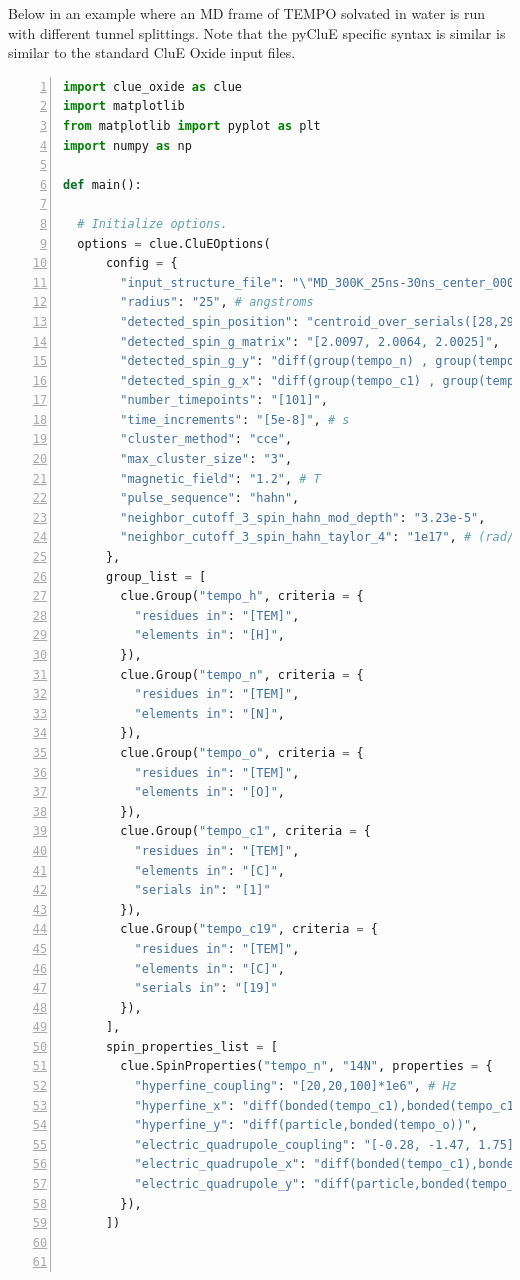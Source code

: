 \documentclass{book}
\begin{document}
Below in an example where an MD frame of TEMPO solvated in water is run with
different tunnel splittings.  
Note that the pyCluE specific syntax is similar is similar to the standard 
CluE Oxide input files. 
\begin{lstlisting}[frame=single,numbers=left,language=python]
import clue_oxide as clue
import matplotlib
from matplotlib import pyplot as plt
import numpy as np

def main():

  # Initialize options.
  options = clue.CluEOptions(
      config = {
        "input_structure_file": "\"MD_300K_25ns-30ns_center_0001.pdb\"",
        "radius": "25", # angstroms
        "detected_spin_position": "centroid_over_serials([28,29])",
        "detected_spin_g_matrix": "[2.0097, 2.0064, 2.0025]",
        "detected_spin_g_y": "diff(group(tempo_n) , group(tempo_o) )",
        "detected_spin_g_x": "diff(group(tempo_c1) , group(tempo_c19) )",
        "number_timepoints": "[101]",
        "time_increments": "[5e-8]", # s
        "cluster_method": "cce",
        "max_cluster_size": "3",
        "magnetic_field": "1.2", # T
        "pulse_sequence": "hahn",
        "neighbor_cutoff_3_spin_hahn_mod_depth": "3.23e-5",
        "neighbor_cutoff_3_spin_hahn_taylor_4": "1e17", # (rad/s)^4
      },
      group_list = [
        clue.Group("tempo_h", criteria = {
          "residues in": "[TEM]",
          "elements in": "[H]",
        }),
        clue.Group("tempo_n", criteria = {
          "residues in": "[TEM]",
          "elements in": "[N]",
        }),
        clue.Group("tempo_o", criteria = {
          "residues in": "[TEM]",
          "elements in": "[O]",
        }),
        clue.Group("tempo_c1", criteria = {
          "residues in": "[TEM]",
          "elements in": "[C]",
          "serials in": "[1]"
        }),
        clue.Group("tempo_c19", criteria = {
          "residues in": "[TEM]",
          "elements in": "[C]",
          "serials in": "[19]"
        }),
      ],
      spin_properties_list = [
        clue.SpinProperties("tempo_n", "14N", properties = {
          "hyperfine_coupling": "[20,20,100]*1e6", # Hz
          "hyperfine_x": "diff(bonded(tempo_c1),bonded(tempo_c19))",
          "hyperfine_y": "diff(particle,bonded(tempo_o))",
          "electric_quadrupole_coupling": "[-0.28, -1.47, 1.75]*1e6", # Hz
          "electric_quadrupole_x": "diff(bonded(tempo_c1),bonded(tempo_c19))",
          "electric_quadrupole_y": "diff(particle,bonded(tempo_o))",
        }),
      ])



\end{lstlisting}
\end{document}
